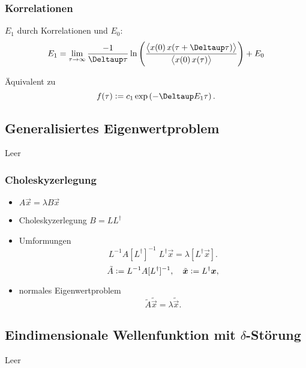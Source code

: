 \documentclass[ngerman, fleqn]{beamer}
\begin{document}
\begin{frame}
    \frametitle{Korrelationen}

    $E_1$ durch Korrelationen und $E_0$:
    \[
        E_1 = \lim_{\tau \to \infty} \frac{-1}{\Deltaup \tau} \ln
        \del{\frac{\Bracket{x(0) \, x(\tau + \Deltaup \tau)}}{\Bracket{x(0) \,
        x(\tau)}}} + E_0
    \]

    Äquivalent zu
    \[
        f(\tau) := c_1 \exp\del{-\Deltaup E_1 \tau}.
    \]
\end{frame}

\subsection{Generalisiertes Eigenwertproblem}

\begin{frame}
    Leer
\end{frame}

\begin{frame}
    \frametitle{Choleskyzerlegung}

    \begin{itemize}
        \item
            $A \vec x = \lambda B \vec x$

        \item
            Choleskyzerlegung $B = L L^\dagger$ 

        \item
            Umformungen
            \[
                L^{-1} A [L^\dagger]^{-1} \; L^\dagger \vec x
                =
                \lambda [L^\dagger \vec x].
            \]
            \[
                \tilde{A} := L^{-1} A [L^\dagger]^{-1}
                ,\quad
                \tilde{\boldsymbol{x}} := L^\dagger \boldsymbol{x},
            \]

        \item
            normales Eigenwertproblem
            \[
                \tilde{A} \tilde{\vec x} = \lambda \tilde{\vec x}.
            \]
    \end{itemize}
\end{frame}

\subsection{Eindimensionale Wellenfunktion mit $\delta$-Störung}

\begin{frame}
    Leer
\end{frame}
\end{document}
